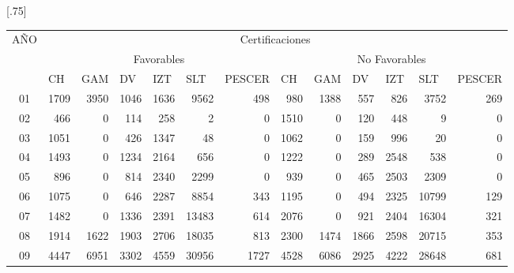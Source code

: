 \documentclass[12pt]{article}
\begin{document}
\newpage


\begin{table}[ht]
\centering
\scalebox{0.75}[.75]{
\begin{tabular}{||c||rrrrrr||rrrrrr||}
\hline\hline
\multicolumn{1}{||c||}{\multirow{3}{*}{AÑO}} & \multicolumn{12}{c||}{Certificaciones}                                                                                                                                                                                                                                                                                               \\ \cline{2-13} 
\multicolumn{1}{||c||}{}& \multicolumn{6}{c||}{Favorables}                                                                                                                                  & \multicolumn{6}{c||}{No Favorables}                                                                                                                               \\ \cline{2-13} 
\multicolumn{1}{||c||}{}& \multicolumn{1}{l|}{CH} & \multicolumn{1}{l|}{GAM} & \multicolumn{1}{l|}{DV} & \multicolumn{1}{l|}{IZT} & \multicolumn{1}{l|}{SLT} & \multicolumn{1}{l||}{PESCER} & \multicolumn{1}{l|}{CH} & \multicolumn{1}{l|}{GAM} & \multicolumn{1}{l|}{DV} & \multicolumn{1}{l|}{IZT} & \multicolumn{1}{l|}{SLT} & \multicolumn{1}{l||}{PESCER} \\ \hline
01 &  1709 & 3950 & 1046 & 1636 & 9562 & 498&  980 & 1388 &  557 &  826 & 3752  &  269\\
  02 & 466 & 0 & 114 & 258 & 2 & 0& 1510 &    0  & 120 &  448 &    9  &    0\\
  03 & 1051 & 0 & 426 & 1347 & 48 & 0 & 1062 &    0  & 159 &  996 &   20  &    0\\
  04 & 1493 & 0 & 1234 & 2164 & 656 & 0& 1222 &    0  & 289 & 2548 &  538  &    0\\
  05 & 896 & 0 & 814 & 2340 & 2299 & 0&  939 &    0  & 465 & 2503 & 2309  &    0\\
  06 & 1075 & 0 & 646 & 2287 & 8854 & 343& 1195 &    0  & 494 & 2325 &10799  &  129\\
  07 & 1482 & 0 & 1336 & 2391 & 13483 & 614& 2076 &    0  & 921 & 2404 &16304  &  321\\
  08 & 1914 & 1622 & 1903 & 2706 & 18035 & 813& 2300 & 1474 & 1866 & 2598 &20715  &  353\\
  09 & 4447 & 6951&3302&  4559 &30956 &  1727& 4528 & 6086 & 2925 & 4222 &28648   &681\\

\end{tabular}}
\end{table}
\end{document}
